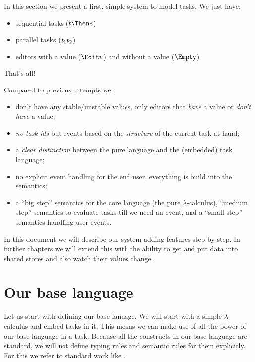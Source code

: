 
In this section we present a first, simple system to model tasks.
We just have:
\begin{itemize}
  \item sequential tasks ($t \Then e$)
  \item parallel tasks ($t_1 \relax t_2$)
  \item editors with a value ($\Edit v$) and without a value ($\Empty$)
\end{itemize}
That's all!

Compared to previous attempts we:
\begin{itemize}
  \item don't have any stable/unstable values,
    only editors that \emph{have} a value or \emph{don't have} a value;
  \item \emph{no task ids} but events based on the \emph{structure} of the current task at hand;
  \item a \emph{clear distinction} between the pure language and the (embedded) task language;
  \item no explicit event handling for the end user, everything is build into the semantics;
  \item a \enquote{big step} semantics for the core language (the pure $\lambda$-calculus),
    \enquote{medium step} semantics to evaluate tasks till we need an event,
    and a \enquote{small step} semantics handling user events.
\end{itemize}

In this document we will describe our system adding features step-by-step.
In further chapters we will extend this with the ability to get and put data into shared stores
and also watch their values change.


\section{Our base language}

Let us start with defining our base lanuage.
We will start with a simple $\lambda$-calculus
and embed tasks in it.
This means we can make use of all the power of our base language in a task.
Because all the constructs in our base language are standard,
we will not define typing rules and semantic rules for them explicitly.
For this we refer to standard work like \textcite{Pierce:2002tp}.

